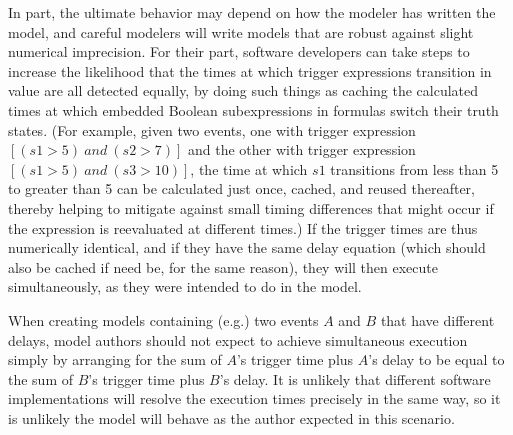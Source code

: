 In part, the ultimate behavior may depend on how the modeler has
written the model, and careful modelers will write models that are
robust against slight numerical imprecision.  For their part,
software developers can take steps to increase the likelihood that
the times at which trigger expressions transition in value are all
detected equally, by doing such things as caching the calculated
times at which embedded Boolean subexpressions in \Trigger
formulas switch their truth states.  (For example, given two
events, one with trigger expression $[(s1 > 5)\ and\ (s2 > 7)]$
and the other with trigger expression $[(s1 > 5)\ and\ (s3 >
10)]$, the time at which $s1$ transitions from less than 5 to
greater than 5 can be calculated just once, cached, and reused
thereafter, thereby helping to mitigate against small timing
differences that might occur if the expression is reevaluated at
different times.)  If the trigger times are thus numerically
identical, and if they have the same delay equation (which should
also be cached if need be, for the same reason), they will then
execute simultaneously, as they were intended to do in the model.

When creating models containing (e.g.) two events $A$ and $B$ that
have different delays, model authors should not expect to achieve
simultaneous execution simply by arranging for the sum of $A$'s
trigger time plus $A$'s delay to be equal to the sum of $B$'s
trigger time plus $B$'s delay.  It is unlikely that different
software implementations will resolve the execution times
precisely in the same way, so it is unlikely the model will behave
as the author expected in this scenario.

